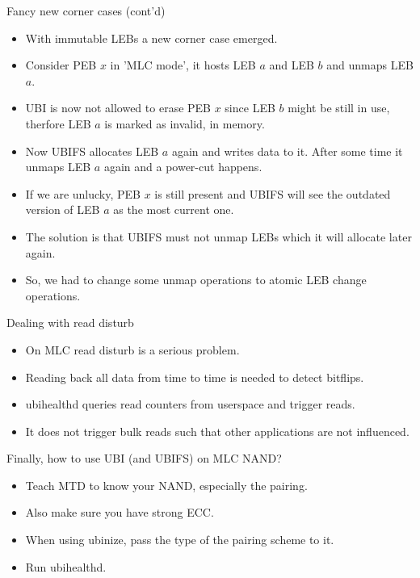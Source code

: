 \documentclass[aspectratio=169,obeyspaces,spaces,hyphens,dvipsnames]{beamer}
\begin{document}
\begin{frame}{Fancy new corner cases (cont'd)}
  \begin{itemize}
  \item With immutable LEBs a new corner case emerged.
  \item Consider PEB $x$ in 'MLC mode', it hosts LEB $a$ and LEB $b$ and unmaps LEB $a$.
  \item UBI is now not allowed to erase PEB $x$ since LEB $b$ might be still in use, therfore LEB $a$ is marked
        as invalid, in memory.
  \item Now UBIFS allocates LEB $a$ again and writes data to it. After some time it unmaps LEB $a$ again and
        a power-cut happens.
  \item If we are unlucky, PEB $x$ is still present and UBIFS will see the outdated version of LEB $a$ as the most current one.
  \item The solution is that UBIFS must not unmap LEBs which it will allocate later again.
  \item So, we had to change some unmap operations to atomic LEB change operations.
  \end{itemize}
\end{frame}

\begin{frame}{Dealing with read disturb}
  \begin{itemize}
  \item On MLC read disturb is a serious problem.
  \item Reading back all data from time to time is needed to detect bitflips.
  \item ubihealthd queries read counters from userspace and trigger reads.
  \item It does not trigger bulk reads such that other applications are not influenced.
  \end{itemize}
\end{frame}

\begin{frame}{Finally, how to use UBI (and UBIFS) on MLC NAND?}
  \begin{itemize}
  \item Teach MTD to know your NAND, especially the pairing.
  \item Also make sure you have strong ECC.
  \item When using ubinize, pass the type of the pairing scheme to it.
  \item Run ubihealthd.
  \end{itemize}
\end{frame}
\end{document}
